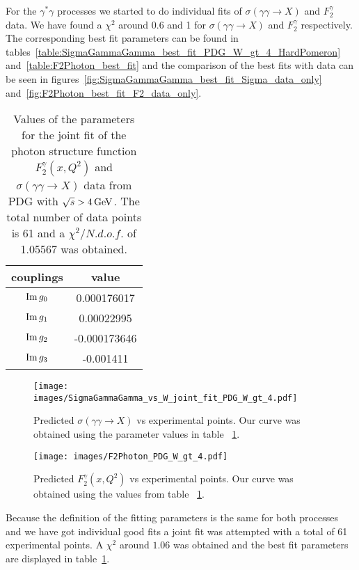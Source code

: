 \documentclass[preprint, 12pt]{elsarticle}
\begin{document}
For the $\gamma^* \gamma$ processes we started to do individual fits of $\sigma\left(\gamma \gamma \rightarrow X\right)$ and $F_2^\gamma$ data. We have found a $\chi^2$ around 0.6 and 1 for $\sigma\left(\gamma \gamma \rightarrow X\right)$ and $F_2^\gamma$ respectively. The corresponding best fit parameters can be found in tables~\ref{table:SigmaGammaGamma_best_fit_PDG_W_gt_4_HardPomeron} and~\ref{table:F2Photon_best_fit} and the comparison of the best fits with data can be seen in figures~\ref{fig:SigmaGammaGamma_best_fit_Sigma_data_only} and~\ref{fig:F2Photon_best_fit_F2_data_only}. 
\begin{table}[b!]
\centering
\caption{Values of the parameters for the joint fit of the photon structure function $F_2^{\gamma}\left(x, Q^2\right)$ and $\sigma\left(\gamma \gamma \rightarrow X\right)$ data from PDG with $\sqrt{s} > 4 {\rm \, GeV}$. The total number of data points is 61 and a $\chi^2 / {N.d.o.f.}$ of 1.05567 was obtained.}
\vspace{0.5cm}
\begin{tabular}{|c|c|}
\hline
couplings   & value \\
\hline
${\rm Im} \, g_0$  & 0.000176017\\ 
\hline
${\rm Im} \, g_1$  & 0.00022995 \\ 
\hline
${\rm Im} \, g_2$  & -0.000173646 \\
\hline
${\rm Im} \, g_3$  & -0.001411 \\ 
\hline
\end{tabular}
\label{table:GammaGamma_best_joint_fit}
\end{table}
\begin{figure}[!b]
\center
\texttt{[image: images/SigmaGammaGamma\_vs\_W\_joint\_fit\_PDG\_W\_gt\_4.pdf]} 
\caption{Predicted $\sigma\left(\gamma \gamma \rightarrow X\right)$ vs experimental points. Our curve was obtained using the parameter values in table ~\ref{table:GammaGamma_best_joint_fit}.}
\label{fig:SigmaGammaGamma_best_joint_fit}
\end{figure}
\begin{figure}[!b]
\center
\texttt{[image: images/F2Photon\_PDG\_W\_gt\_4.pdf]} 
\caption{Predicted $F_2^\gamma\left(x, Q^2\right)$ vs experimental points. Our curve was obtained using the values from table ~\ref{table:GammaGamma_best_joint_fit}.}
\label{fig:F2Photon_best_joint_fit}
\end{figure}
Because the definition of the fitting parameters is the same for both processes and we have got individual good fits a joint fit was attempted with a total of  61 experimental points. A $\chi^2$ around $1.06$ was obtained and the best fit parameters are displayed in table~\ref{table:GammaGamma_best_joint_fit}.
\end{document}
